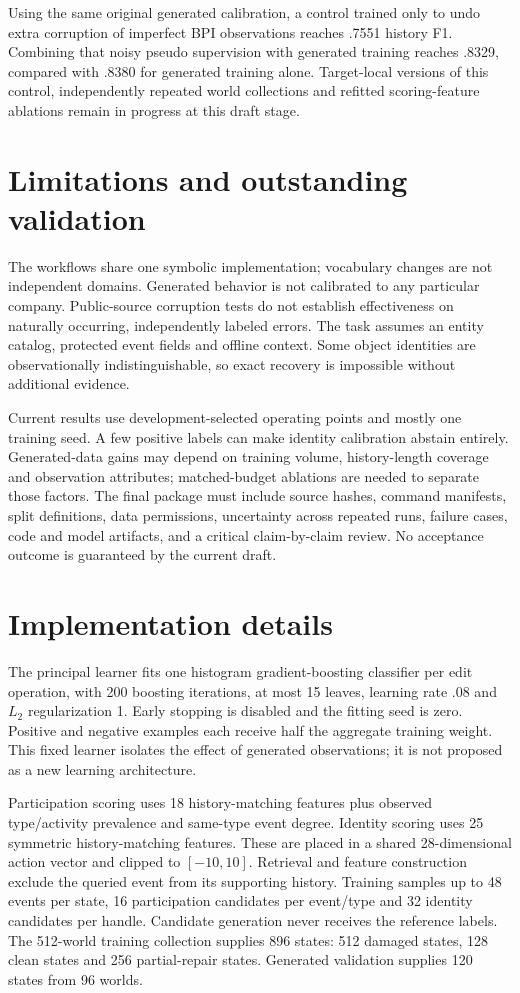 \documentclass[11pt]{article}
\begin{document}
Using the same original generated calibration, a control trained only to undo extra corruption of imperfect BPI observations reaches .7551 history F1. Combining that noisy pseudo supervision with generated training reaches .8329, compared with .8380 for generated training alone. Target-local versions of this control, independently repeated world collections and refitted scoring-feature ablations remain in progress at this draft stage.

\section{Limitations and outstanding validation}
The workflows share one symbolic implementation; vocabulary changes are not independent domains. Generated behavior is not calibrated to any particular company. Public-source corruption tests do not establish effectiveness on naturally occurring, independently labeled errors. The task assumes an entity catalog, protected event fields and offline context. Some object identities are observationally indistinguishable, so exact recovery is impossible without additional evidence.

Current results use development-selected operating points and mostly one training seed. A few positive labels can make identity calibration abstain entirely. Generated-data gains may depend on training volume, history-length coverage and observation attributes; matched-budget ablations are needed to separate those factors. The final package must include source hashes, command manifests, split definitions, data permissions, uncertainty across repeated runs, failure cases, code and model artifacts, and a critical claim-by-claim review. No acceptance outcome is guaranteed by the current draft.

\appendix
\section{Implementation details}
The principal learner fits one histogram gradient-boosting classifier per edit operation, with 200 boosting iterations, at most 15 leaves, learning rate .08 and $L_2$ regularization 1. Early stopping is disabled and the fitting seed is zero. Positive and negative examples each receive half the aggregate training weight. This fixed learner isolates the effect of generated observations; it is not proposed as a new learning architecture.

Participation scoring uses 18 history-matching features plus observed type/activity prevalence and same-type event degree. Identity scoring uses 25 symmetric history-matching features. These are placed in a shared 28-dimensional action vector and clipped to $[-10,10]$. Retrieval and feature construction exclude the queried event from its supporting history. Training samples up to 48 events per state, 16 participation candidates per event/type and 32 identity candidates per handle. Candidate generation never receives the reference labels. The 512-world training collection supplies 896 states: 512 damaged states, 128 clean states and 256 partial-repair states. Generated validation supplies 120 states from 96 worlds.
\end{document}
